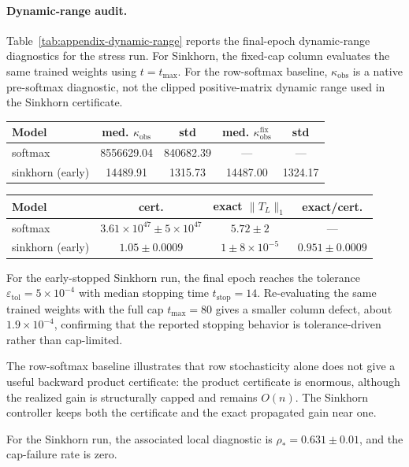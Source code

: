 \paragraph{Dynamic-range audit.}
Table~\ref{tab:appendix-dynamic-range} reports the final-epoch dynamic-range
diagnostics for the stress run. For Sinkhorn, the fixed-cap column evaluates the
same trained weights using \(t=t_{\max}\). For the row-softmax baseline,
\(\kappa_{\mathrm{obs}}\) is a native pre-softmax diagnostic, not the clipped
positive-matrix dynamic range used in the Sinkhorn certificate.

\begin{center}
\centering
\small
{}
\label{tab:appendix-dynamic-range}
\begin{tabular}{lcccc}
\toprule
Model & med. $\kappa_{\mathrm{obs}}$ & std & med. $\kappa_{\mathrm{obs}}^{\mathrm{fix}}$ & std \\
\midrule
softmax & 8556629.04 & 840682.39 & --- & --- \\
sinkhorn (early) & 14489.91 & 1315.73 & 14487.00 & 1324.17 \\
\bottomrule
\end{tabular}
\end{center}

\begin{center}
\centering
\small
{}
\label{tab:stack_certificate_diag}
\begin{tabular}{lccc}
\toprule
Model & cert. & exact $\|T_L\|_1$ & exact/cert. \\
\midrule
softmax & \(3.61{\times}10^{47}\pm5{\times}10^{47}\) & \(5.72\pm2\) & --- \\
sinkhorn (early) & \(1.05\pm0.0009\) & \(1\pm8{\times}10^{-5}\) & \(0.951\pm0.0009\) \\
\bottomrule
\end{tabular}
\end{center}
\FloatBarrier

\noindent For the early-stopped Sinkhorn run, the final epoch reaches the tolerance
\(\varepsilon_{\mathrm{tol}}=5\times 10^{-4}\) with median stopping time
\(t_{\mathrm{stop}}=14\). Re-evaluating the same trained weights with the full cap
\(t_{\max}=80\) gives a smaller column defect, about \(1.9\times 10^{-4}\), confirming
that the reported stopping behavior is tolerance-driven rather than cap-limited.

The row-softmax baseline illustrates that row stochasticity alone does not give a useful
backward product certificate: the product certificate is enormous, although the realized
gain is structurally capped and remains \(O(n)\). The Sinkhorn controller keeps both the
certificate and the exact propagated gain near one.

For the Sinkhorn run, the associated local diagnostic is
\(\rho_\ast=0.631\pm0.01\), and the cap-failure rate is zero.
\FloatBarrier
